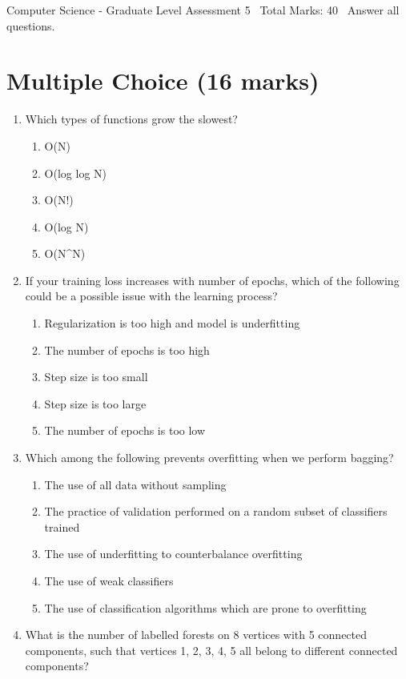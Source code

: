 \documentclass[12pt]{article}
\begin{document}
\begin{center}
Computer Science - Graduate Level Assessment 5 \
Total Marks: 40 \
Answer all questions.
\end{center}

\section*{Multiple Choice (16 marks)}
\begin{enumerate}[label=\arabic*.]
\item Which types of functions grow the slowest?
\begin{enumerate}[label=(\alph*)]
    \item O(N)
    \item O(log log N)
    \item O(N!)
    \item O(log N)
    \item O(N\^{}N)
\end{enumerate}
\item If your training loss increases with number of epochs, which of the following could be a possible issue with the learning process?
\begin{enumerate}[label=(\alph*)]
    \item Regularization is too high and model is underfitting
    \item The number of epochs is too high
    \item Step size is too small
    \item Step size is too large
    \item The number of epochs is too low
\end{enumerate}
\item Which among the following prevents overfitting when we perform bagging?
\begin{enumerate}[label=(\alph*)]
    \item The use of all data without sampling
    \item The practice of validation performed on a random subset of classifiers trained
    \item The use of underfitting to counterbalance overfitting
    \item The use of weak classifiers
    \item The use of classification algorithms which are prone to overfitting
\end{enumerate}
\item What is the number of labelled forests on 8 vertices with 5 connected components, such that vertices 1, 2, 3, 4, 5 all belong to different connected components?

\end{enumerate}
\end{document}
